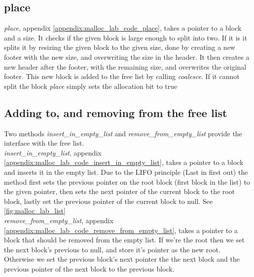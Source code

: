 \documentclass[11pt]{report}
\begin{document}
\newpage
\subsection{place}
\textit{place}, appendix \ref{appendix:malloc_lab_code_place}, takes a pointer to a block and a size. It checks if the given block is large enough to split into two. If it is it splits it by resizing the given block to the given size, done by creating a new footer with the new size, and overwriting the size in the header. It then creates a new header after the footer, with the remaining size, and overwrites the original footer. This new block is added to the free list by calling \textit{coalesce}. If it cannot split the block \textit{place} simply sets the allocation bit to true\\[1ex]

\subsection{Adding to, and removing from the free list}
Two methods \textit{insert\_in\_empty\_list} and \textit{remove\_from\_empty\_list} provide the interface with the free list.\\[1ex]

\textit{insert\_in\_empty\_list}, appendix \ref{appendix:malloc_lab_code_insert_in_empty_list}, takes a pointer to a block and inserts it in the empty list. Due to the LIFO principle (Last in first out) the method first sets the previous pointer on the root block (first block in the list) to the given pointer, then sets the next pointer of the current block to the root block, lastly set the previous pointer of the current block to null. See \ref{fig:malloc_lab_list}\\[1ex]

\textit{remove\_from\_empty\_list}, appendix \ref{appendix:malloc_lab_code_remove_from_empty_list}, takes a pointer to a block that should be removed from the empty list. If we're the root then we set the next block's previous to null, and store it's pointer as the new root. Otherwise we set the previous block's next pointer the the next block and the previous pointer of the next block to the previous block.\\[1ex]
\end{document}
